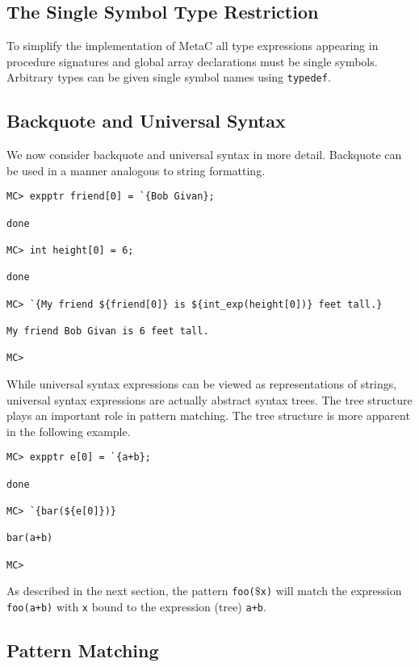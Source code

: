 \documentclass{article}
\begin{document}
\subsection{The Single Symbol Type Restriction}

To simplify the implementation of MetaC all type expressions appearing in procedure signatures and global array declarations must be single symbols.
Arbitrary types can be given single symbol names using {\tt typedef}.

\subsection{Backquote and Universal Syntax}

We now consider backquote and universal syntax in more detail.  Backquote can be used in a manner analogous to string formatting.

\begin{verbatim}
MC> expptr friend[0] = `{Bob Givan};

done

MC> int height[0] = 6;

done

MC> `{My friend ${friend[0]} is ${int_exp(height[0])} feet tall.}

My friend Bob Givan is 6 feet tall.

MC> 
\end{verbatim}

While universal syntax expressions can be viewed as representations of strings, universal syntax
expressions are actually abstract syntax trees. The tree structure
plays an important role in pattern matching. The tree structure is
more apparent in the following example.

\begin{verbatim}
MC> expptr e[0] = `{a+b};

done

MC> `{bar(${e[0]})}

bar(a+b)

MC>
\end{verbatim}

As described in the next section, the pattern {\tt foo($\$$x)} will match the expression {\tt foo(a+b)} with {\tt x} bound to the expression (tree) {\tt a+b}.

\subsection{Pattern Matching}
\end{document}
